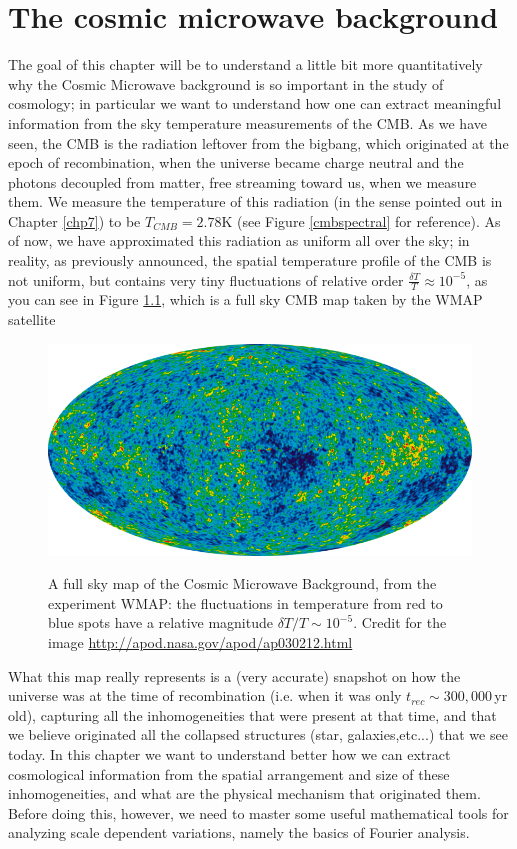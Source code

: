 \documentclass[11pt, a4paper,oneside,openright]{book}
\numberwithin{equation}{section}
\begin{document}
\chapter{The cosmic microwave background}
The goal of this chapter will be to understand a little bit more quantitatively why the Cosmic Microwave background is so important in the study of cosmology; in particular we want to understand how one can extract meaningful information from the sky temperature measurements of the CMB. As we have seen, the CMB is the radiation leftover from the bigbang, which originated at the epoch of recombination, when the universe became charge neutral and the photons decoupled from matter, free streaming toward us, when we measure them. We measure the temperature of this radiation (in the sense pointed out in Chapter \ref{chp7}) to be $T_{CMB}=2.78$K (see Figure \ref{cmbspectral} for reference). As of now, we have approximated this radiation as uniform all over the sky; in reality, as previously announced, the spatial temperature profile of the CMB is not uniform, but contains very tiny fluctuations of relative order $\frac{\delta T}{T}\approx 10^{-5}$, as you can see in Figure \ref{cmbwmap}, which is a full sky CMB 
map taken by the WMAP satellite 
\begin{figure}
\begin{center}
\includegraphics[scale=0.5]{CMB/wmap}
\label{}
\end{center}
\caption{A full sky map of the Cosmic Microwave Background, from the experiment WMAP: the fluctuations in temperature from red to blue spots have a relative magnitude $\delta T/T\sim 10^{-5}$.  Credit for the image \url{http://apod.nasa.gov/apod/ap030212.html}}
\label{cmbwmap}
\end{figure}
What this map really represents is a (very accurate) snapshot on how the universe was at the time of recombination (i.e. when it was only $t_{rec}\sim 300,000$\,yr old), capturing all the inhomogeneities that were present at that time, and that we believe originated all the collapsed structures (star, galaxies,etc...) that we see today. In this chapter we want to understand better how we can extract cosmological information from the spatial arrangement and size of these inhomogeneities, and what are the physical mechanism that originated them. Before doing this, however, we need to master some useful mathematical tools for analyzing scale dependent variations, namely the basics of Fourier analysis. 
\end{document}
